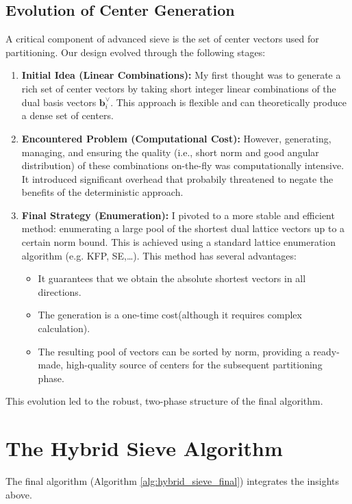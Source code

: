 \documentclass{article}
\begin{document}
\subsection{Evolution of Center Generation}
A critical component of advanced sieve is the set of center vectors used for partitioning. 
Our design evolved through the following stages:

\begin{enumerate}
    \item \textbf{Initial Idea (Linear Combinations):} My first thought was to generate a rich set of center vectors by 
    taking short integer linear combinations of the dual basis vectors $\mathbf{b}_i^{\vee}$. This approach is flexible 
    and can theoretically produce a dense set of centers.
    \item \textbf{Encountered Problem (Computational Cost):} However, generating, managing, and ensuring the quality (i.e., 
    short norm and good angular distribution) of these combinations on-the-fly was computationally intensive. 
    It introduced significant overhead that probabily threatened to negate the benefits of the deterministic approach.
    \item \textbf{Final Strategy (Enumeration):} I pivoted to a more stable and efficient method: enumerating a large pool of the 
    shortest dual lattice vectors up to a certain norm bound. This is achieved using a standard lattice enumeration algorithm 
    (e.g. KFP, SE,\ldots). This method has several advantages:
        \begin{itemize}
            \item It guarantees that we obtain the absolute shortest vectors in all directions.
            \item The generation is a one-time cost(although it requires complex calculation).
            \item The resulting pool of vectors can be sorted by norm, providing a ready-made, high-quality source of centers for the subsequent partitioning phase.
\end{itemize}
\end{enumerate}
This evolution led to the robust, two-phase structure of the final algorithm.

\section{The Hybrid Sieve Algorithm}

The final algorithm (Algorithm \ref{alg:hybrid_sieve_final}) integrates the insights above. 
\end{document}
